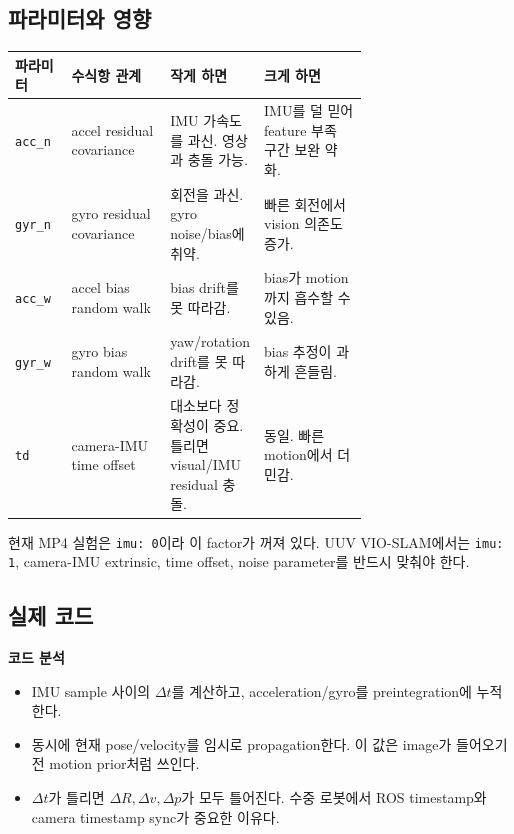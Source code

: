 \documentclass[11pt,a4paper]{article}
\newcommand{\code}[1]{\texttt{#1}}
\newcommand{\codeheading}[1]{\par\vspace{6pt}\noindent{\footnotesize\bfseries\textcolor{codeemph}{#1}}\par\vspace{2pt}}
\newcommand{\readpoint}[1]{\par\noindent{\footnotesize\textcolor{muted}{읽는 포인트: #1}}\par\vspace{2pt}}
\newenvironment{codeanalysis}{%
  \par\vspace{2pt}\noindent
  {\footnotesize\bfseries\textcolor{accentblue}{코드 분석}}\par
  \begin{itemize}[leftmargin=1.35em,topsep=2pt,itemsep=1pt,parsep=0pt]
  \footnotesize
}{%
  \end{itemize}
  \vspace{6pt}
}
\begin{document}
\subsection*{파라미터와 영향}

\small
\begin{tabularx}{\linewidth}{p{0.16\linewidth}p{0.28\linewidth}p{0.26\linewidth}Y}
\toprule
\textbf{파라미터} & \textbf{수식항 관계} & \textbf{작게 하면} & \textbf{크게 하면} \\
\midrule
\code{acc\_n} & accel residual covariance & IMU 가속도를 과신. 영상과 충돌 가능. & IMU를 덜 믿어 feature 부족 구간 보완 약화. \\
\code{gyr\_n} & gyro residual covariance & 회전을 과신. gyro noise/bias에 취약. & 빠른 회전에서 vision 의존도 증가. \\
\code{acc\_w} & accel bias random walk & bias drift를 못 따라감. & bias가 motion까지 흡수할 수 있음. \\
\code{gyr\_w} & gyro bias random walk & yaw/rotation drift를 못 따라감. & bias 추정이 과하게 흔들림. \\
\code{td} & camera-IMU time offset & 대소보다 정확성이 중요. 틀리면 visual/IMU residual 충돌. & 동일. 빠른 motion에서 더 민감. \\
\bottomrule
\end{tabularx}
\normalsize

현재 MP4 실험은 \code{imu: 0}이라 이 factor가 꺼져 있다.
UUV VIO-SLAM에서는 \code{imu: 1}, camera-IMU extrinsic, time offset, noise parameter를 반드시 맞춰야 한다.

\subsection*{실제 코드}

\readpoint{IMU sample이 들어올 때마다 preintegration과 임시 propagation이 동시에 갱신된다.}
\codeheading{estimator.cpp:375--405}

\begin{codeanalysis}
  \item IMU sample 사이의 \(\Delta t\)를 계산하고, acceleration/gyro를 preintegration에 누적한다.
  \item 동시에 현재 pose/velocity를 임시로 propagation한다. 이 값은 image가 들어오기 전 motion prior처럼 쓰인다.
  \item \(\Delta t\)가 틀리면 \(\Delta R,\Delta v,\Delta p\)가 모두 틀어진다. 수중 로봇에서 ROS timestamp와 camera timestamp sync가 중요한 이유다.
\end{codeanalysis}
\end{document}

